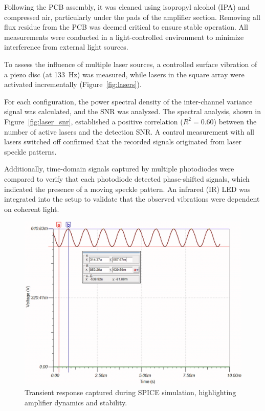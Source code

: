 Following the PCB assembly, it was cleaned using isopropyl alcohol (IPA) and compressed air, particularly under the pads of the amplifier section. 
Removing all flux residue from the PCB was deemed critical to ensure stable operation. All measurements were conducted in a light-controlled environment to minimize interference from external light sources.

To assess the influence of multiple laser sources, a controlled surface vibration of a piezo disc (at 133~Hz) was measured,
while lasers in the square array were activated incrementally (Figure~\ref{fig:lasers}). 

For each configuration, the power spectral density of the inter-channel variance signal was calculated, and the SNR was analyzed. The spectral analysis, shown in Figure~\ref{fig:laser_snr}, 
established a positive correlation ($R^2 = 0.60$) between the number of active lasers and the detection SNR. 
A control measurement with all lasers switched off confirmed that the recorded signals originated from laser speckle patterns.

Additionally, time-domain signals captured by multiple photodiodes were compared to verify that each photodiode detected phase-shifted signals, which indicated the presence of a moving speckle pattern. 
An infrared (IR) LED was integrated into the setup to validate that the observed vibrations were dependent on coherent light.

\begin{figure}[t]
\centering
\includegraphics[width=\widthnarrow]{figures/eval/transient}
\caption{Transient response captured during SPICE simulation, highlighting amplifier dynamics and stability.}
\label{fig:transient}
\end{figure}

